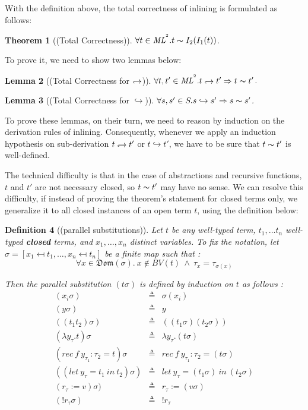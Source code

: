 \documentclass[a4paper,11pt,oneside]{article}
\theoremstyle{plain}
\newtheorem{definition}{Definition}[subsection]
\newtheorem{lemma}[definition]{Lemma}
\newtheorem{theorem}[definition]{Theorem}
\newcommand{\bwedge}{\boldsymbol{~\wedge~}}
\newcommand{\eqv}[1]{#1 \thicksim #1'}
\newcommand{\inlsrc}{\textit{ML}^{^2}}
\newcommand{\hookdownarrow}{\mathrel{\rotatebox[origin=c]{180}{$\hookleftarrow$}}}
\newcommand{\ilarr}{\hookdownarrow}
\newcommand{\il}[2]{#1 \ilarr #2}
\newcommand{\icarr}{\hookrightarrow}
\newcommand{\ic}[2]{#1 \icarr #2}
\begin{document}
  With the definition above, the total correctness of inlining is formulated as follows:
  
  \begin{theorem}[(Total Correctness)]
   $ \forall t \in \inlsrc. t \thicksim I_2(I_1(t))$.
  \end{theorem}

	To prove it, we need to show two lemmas below:
	\begin{lemma}[(Total Correctness for $\ilarr$)]
   $ \forall t,t' \in \inlsrc. \il{t}{t'} \Rightarrow t \thicksim t'$.
  \end{lemma}

	\begin{lemma}[(Total Correctness for $\icarr$)]
   $ \forall s,s' \in S. \ic{s}{s'} \Rightarrow s \thicksim s'$.
  \end{lemma}
  
 	To prove these lemmas, on their turn, we need to reason by induction on the derivation rules of inlining. 
  Consequently, whenever we apply an induction hypothesis on sub-derivation $\il{t}{t'}$ or $\ic{t}{t'}$, we have to be sure that $\eqv{t}$ is well-defined. 
  
  The technical difficulty is that in the case of abstractions and recursive functions, $t$ and $t'$ are not necessary closed, so $\eqv{t}$ may have no sense.  
	We can resolve this difficulty, if instead of proving the theorem's statement for closed terms only, we generalize it to all closed instances of an open term $t$, using the definition below:
 
	\begin{definition}[(parallel substitutions)]
	Let $t$ be any well-typed term, $t_1, \dots t_n$ well-typed 
	\textit{\textbf{closed}} terms, and $x_1, \dots, x_n$ distinct variables.
	To fix the notation, 
	let $\sigma = [x_1 \mapsfrom t_1, \dots, x_n \mapsfrom t_n] $ be
	a finite map such that :  	
	$$\forall x\in\mathfrak{Dom}(\sigma).~x\notin BV(t)\bwedge\tau_x=
	\tau_{\sigma(x)}$$

	Then the parallel substitution $(t\sigma)$ is defined by induction on $t$ 
	as follows :
	\begin{displaymath}
	\begin{array}{lll}
	 (x_i\sigma)& \triangleq & \sigma(x_i)\\
	 (y\sigma)& \triangleq & y \\
	 ((t_1t_2)\sigma) & \triangleq & ((t_1\sigma)(t_2\sigma))\\
	 (\lambda y_{\tau}. t)\sigma & \triangleq & \lambda y_\tau. (t\sigma)\\
	 (rec~f~y_{\tau_1} : \tau_2 = t)\sigma & \triangleq 
	   & rec~f~y_{\tau_1} : \tau_2 = (t\sigma) \\
	 ((let~y_\tau = t_1~ in~ t_2)\sigma) & \triangleq 
	   & let~y_\tau = (t_1\sigma)~in~ (t_2\sigma)\\
	  (r_\tau := v)\sigma)	& \triangleq & r_\tau := (v\sigma) \\
	 (!r_\tau\sigma) & \triangleq & !r_\tau \\
	     	 
	\end{array}
	\end{displaymath}
	\end{definition}
\end{document}
